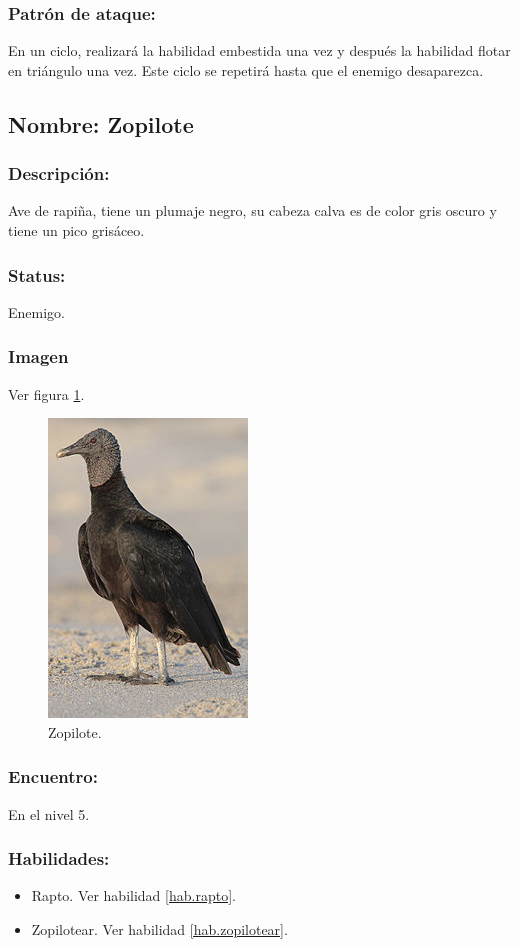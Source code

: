 \documentclass[11pt,letterpaper]{article}
\begin{document}
\subsubsection{Patrón de ataque:}
En un ciclo, realizará la habilidad embestida una vez y después la habilidad flotar en triángulo una vez. Este ciclo se repetirá hasta que el enemigo desaparezca.

\subsection{Nombre: Zopilote}   \label{per.zopilote}
\subsubsection{Descripción:}
Ave de rapiña, tiene un plumaje negro, su cabeza calva es de color gris oscuro y tiene un pico grisáceo.
\subsubsection{Status:}
Enemigo.
\subsubsection{Imagen}
Ver figura \ref{fig:zopilote}.
\begin{figure}
	\centering
	\includegraphics[height=0.2 \textheight]{Imagenes/zopilote}
	\caption{Zopilote.}
	\label{fig:zopilote}
\end{figure}
\subsubsection{Encuentro:}
En el nivel 5.
\subsubsection{Habilidades:}
\begin{itemize}
	\item Rapto. Ver habilidad \ref{hab.rapto}.
	\item Zopilotear. Ver habilidad \ref{hab.zopilotear}.
\end{itemize}
\end{document}

